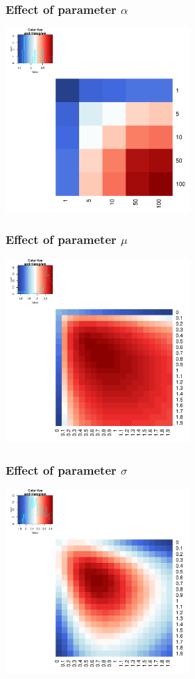 \documentclass[8pt]{beamer}
\begin{document}
\begin{frame}
\frametitle{Effect of parameter $\alpha$}
\vskip5mm
\hskip1cm
\includegraphics[width=7cm]{bilder/alpha_marg.pdf}
\end{frame}

\begin{frame}
\frametitle{Effect of parameter $\mu$}
\vskip5mm
\hskip1cm
\includegraphics[width=7cm]{bilder/mean_marg.pdf}
\end{frame}

\begin{frame}
\frametitle{Effect of parameter $\sigma$}
\vskip5mm
\hskip1cm
\includegraphics[width=7cm]{bilder/sigma_marg.pdf}
\end{frame}
\end{document}
